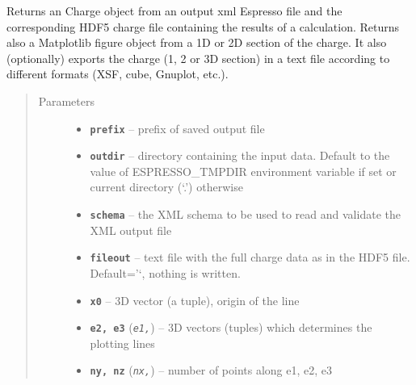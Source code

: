 \documentclass[letterpaper,10pt,english]{sphinxmanual}
\begin{document}

\begin{fulllineitems}
\label{postqe:postqe.api.compute_charge}
Returns an Charge object from an output xml Espresso file and the
corresponding HDF5 charge file containing the results of a calculation.
Returns also a Matplotlib figure object from a 1D or 2D section of the charge.
It also (optionally) exports the charge (1, 2 or 3D section) in a text file according to
different formats (XSF, cube, Gnuplot, etc.).
\begin{quote}\begin{description}
\item[{Parameters}] \leavevmode\begin{itemize}
\item {} 
\textbf{\texttt{prefix}} -- prefix of saved output file

\item {} 
\textbf{\texttt{outdir}} -- directory containing the input data. Default to the value of
ESPRESSO\_TMPDIR environment variable if set or current directory (`.') otherwise

\item {} 
\textbf{\texttt{schema}} -- the XML schema to be used to read and validate the XML output file

\item {} 
\textbf{\texttt{fileout}} -- text file with the full charge data as in the HDF5 file. Default='`, nothing is written.

\item {} 
\textbf{\texttt{x0}} -- 3D vector (a tuple), origin of the line

\item {} 
\textbf{\texttt{e2, e3}} (\emph{\texttt{e1,}}) -- 3D vectors (tuples) which determines the plotting lines

\item {} 
\textbf{\texttt{ny, nz}} (\emph{\texttt{nx,}}) -- number of points along e1, e2, e3


\end{itemize}
\end{description}
\end{quote}
\end{fulllineitems}
\end{document}
